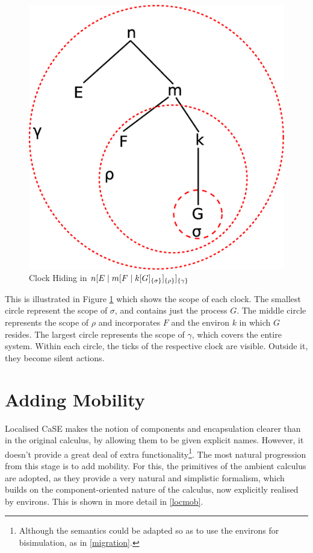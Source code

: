 \begin{figure}  
  \centering
  \includegraphics[scale=0.3]{environs}
  \caption{Clock Hiding in ${n}[ E\;|\;{m}[ F\;|\;{k}[ G ]_{\{\sigma\}} ]_{\{\rho\}} ]_{\{\gamma\}}$}
  \label{fig:clockhiding}
\end{figure}

This is illustrated in Figure \ref{fig:clockhiding} which shows the
scope of each clock.  The smallest circle represent the scope of
$\sigma$, and contains just the process $G$.  The middle circle
represents the scope of $\rho$ and incorporates $F$ and the environ
$k$ in which $G$ resides.  The largest circle represents the scope of
$\gamma$, which covers the entire system.  Within each circle, the
ticks of the respective clock are visible.  Outside it, they become
silent actions.

\section{Adding Mobility}
\label{addingmob}

Localised CaSE makes the notion of components and encapsulation clearer
than in the original calculus, by allowing them to be given explicit
names.  However, it doesn't provide a great deal of extra
functionality\footnote{Although the semantics could be adapted so as to
use the environs for bisimulation, as in \ref{migration}.}.  The most
natural progression from this stage is to add mobility.  For this, the
primitives of the ambient calculus are adopted, as they provide a very
natural and simplistic formalism, which builds on the component-oriented
nature of the calculus, now explicitly realised by environs.  This is
shown in more detail in \ref{locmob}.

